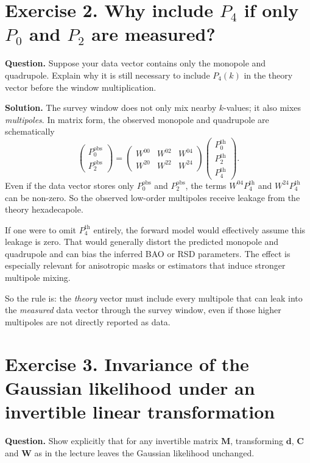 \documentclass[11pt]{article}
\newcommand{\obs}{\mathrm{obs}}
\newcommand{\thm}{\mathrm{th}}
\newcommand{\C}{\mathbf C}
\newcommand{\W}{\mathbf W}
\newcommand{\M}{\mathbf M}
\newcommand{\dvec}{\mathbf d}
\begin{document}
\section*{Exercise 2. Why include $P_4$ if only $P_0$ and $P_2$ are measured?}
\textbf{Question.} Suppose your data vector contains only the monopole and quadrupole. Explain why it is still necessary to include $P_4(k)$ in the theory vector before the window multiplication.

\bigskip
\textbf{Solution.}
The survey window does not only mix nearby $k$-values; it also mixes \emph{multipoles}. In matrix form, the observed monopole and quadrupole are schematically
\[
\begin{pmatrix}
P^{\obs}_0\\
P^{\obs}_2
\end{pmatrix}
=
\begin{pmatrix}
W^{00} & W^{02} & W^{04}\\
W^{20} & W^{22} & W^{24}
\end{pmatrix}
\begin{pmatrix}
P^{\thm}_0\\
P^{\thm}_2\\
P^{\thm}_4
\end{pmatrix}.
\]
Even if the data vector stores only $P_0^{\obs}$ and $P_2^{\obs}$, the terms $W^{04}P_4^{\thm}$ and $W^{24}P_4^{\thm}$ can be non-zero. So the observed low-order multipoles receive leakage from the theory hexadecapole.

If one were to omit $P_4^{\thm}$ entirely, the forward model would effectively assume this leakage is zero. That would generally distort the predicted monopole and quadrupole and can bias the inferred BAO or RSD parameters. The effect is especially relevant for anisotropic masks or estimators that induce stronger multipole mixing.

So the rule is: the \emph{theory} vector must include every multipole that can leak into the \emph{measured} data vector through the survey window, even if those higher multipoles are not directly reported as data.

\section*{Exercise 3. Invariance of the Gaussian likelihood under an invertible linear transformation}
\textbf{Question.} Show explicitly that for any invertible matrix $\M$, transforming $\dvec$, $\C$ and $\W$ as in the lecture leaves the Gaussian likelihood unchanged.
\end{document}
